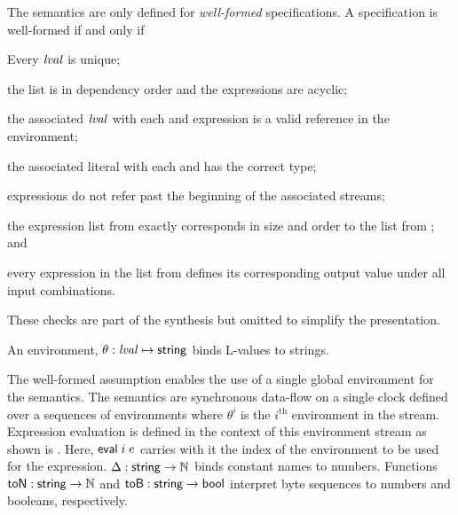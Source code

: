 The semantics are only defined for \emph{well-formed} specifications. A specification is well-formed if and only if
\begin{compactenum}
\item Every $\mathit{lval}$ is unique;
\item the  list is in dependency order and the expressions are acyclic;
\item the associated $\mathit{lval}$ with each  and  expression is a valid reference in the environment;
\item the associated literal with each  and  has the correct type;
\item {} expressions do not refer past the beginning of the associated streams;
\item the expression list from  exactly corresponds in size and order to the list from ; and
\item every expression in the list from  defines its corresponding output value under all input combinations.
\end{compactenum}
These checks are part of the synthesis but omitted to simplify the presentation.

An environment, $\theta: \mathit{lval} \mapsto \mathsf{string}$ binds L-values to strings. 

The well-formed assumption enables the use of a single global environment for the semantics. The semantics are synchronous data-flow on a single clock defined over a sequences of environments where $\theta^i$ is the $i^\mathrm{th}$ environment in the stream. Expression evaluation is defined in the context of this environment stream as shown is . Here, $\mathsf{eval}\; i\; e$ carries with it the index of the environment to be used for the expression. $\Delta : \mathsf{string} \to \mathbb{N}$ binds constant names to numbers. Functions $\mathsf{toN}:\mathsf{string}\to\mathbb{N}$ and $\mathsf{toB}:\mathsf{string}\to\mathsf{bool}$ interpret byte sequences to numbers and booleans, respectively. 

